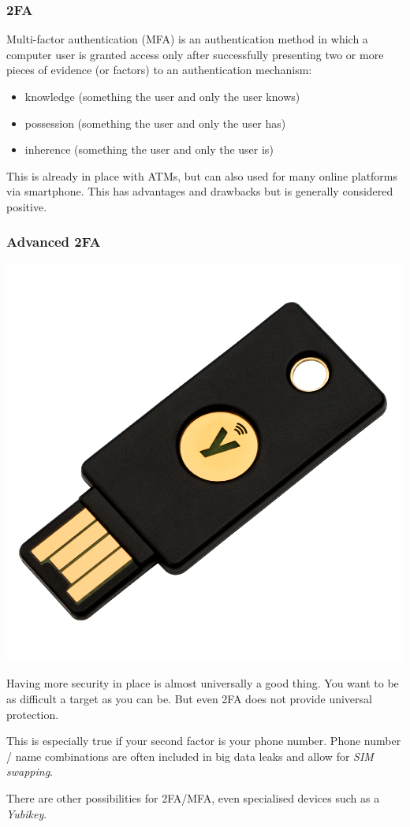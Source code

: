 \documentclass[aspectratio=1610,dvipsnames]{beamer}
\begin{document}
\begin{frame}
\frametitle{2FA}

Multi-factor authentication (MFA) is an authentication method in which a computer user is granted access only after successfully presenting two or more pieces of evidence (or factors) to an authentication mechanism:
\medskip

\begin{itemize}
\item knowledge (something the user and only the user knows)
\item possession (something the user and only the user has)
\item inherence (something the user and only the user is)
\end{itemize}
\pause\bigskip

This is already in place with ATMs, but can also used for many online platforms via smartphone. This has advantages and drawbacks but is generally considered positive.

\end{frame}

\begin{frame}
\frametitle{Advanced 2FA}
\begin{minipage}{0.5\textwidth}
\begin{center}
\includegraphics[height=0.65\textwidth, keepaspectratio]{images/yubikey}
\end{center}
\end{minipage}%
\begin{minipage}{0.5\textwidth}
Having more security in place is almost universally a good thing. You want to be as difficult a target as you can be. But even 2FA does not provide universal protection.
\pause\bigskip

This is especially true if your second factor is your phone number. Phone number / name combinations are often included in big data leaks and allow for \emph{SIM swapping}.
\pause\bigskip

There are other possibilities for 2FA/MFA, even specialised devices such as a \emph{Yubikey}.
\end{minipage}
\end{frame}
\end{document}
